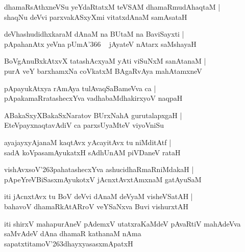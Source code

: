 \documentclass[twoside,12pt,openright]{book}
\def\S{\char'263}
\newcounter{shloka}[chapter]
\begin{document}
\begin{shloka}%
dhamaRsAthxneVSu yeYdaRtatxM teVSAM dhamaRmudAhaqtaM |\\
shaqNu deVvi parxvakASxyXmi vitatxdAnaM samAsataH 
\end{shloka}

\begin{shloka}%
deVhashudidhxkaraM dAnaM na BUtaM na BaviSayxti |\\
pApahanAtx yeVna pUmA\char'366 ~ jAyateV nAtarx saMshayaH
\end{shloka}

\begin{shloka}%
BoVgAnuBxkAtxvX tatashAcxyaM yAti viSuNxM sanAtanaM |\\
purA veY barxhamxNa coVkatxM BAgaRvAya mahAtamxneV 
\end{shloka}

\begin{shloka}%
pApayukAtxya rAmAya tulAvaqSaBameVva ca |\\
pApakamaRratashecxYva vadhabaMdhakirxyoV naqpaH 
\end{shloka}

\begin{shloka}%
ABakaSxyXBakaSxNaratov BUrxNahA gurutalapxgaH |\\
EteVpayxnaqtavAdiV ca parxsUyaMteV viyoVniSu
\end{shloka}

\begin{shloka}%
ayajayxyAjanaM kaqtAvx yAcayitAvx tu niMditAtf |\\
sadA koVpasamAyukatxH sAdhUnAM piVDaneV rataH 
\end{shloka}

\begin{shloka}%
vishAvxsoV\S pahatashecxYva ashucidhaRmaRniMdakaH |\\
pApeYreVBiSasxmAyukotxV jAcnxtAvxtAmxnaM gatAyuSaM
\end{shloka}

\begin{shloka}%
iti jAcnxtAvx tu BoV deVvi dAnaM deVyaM visheVSatAH |\\
bahavoV dhamaRkAtARroV veYSaNxva Buvi vishurxtAH 
\end{shloka}

\begin{center}
iti shirxV mahapurAneV pAdemxV utatxraKaMdeV pAvaRtiV mahAdeVva saMvAdeV dAna dhamaR kathanaM nAma 
sapatxtitamoV\S dhayxyasasxmApatxH 
\end{center}
\end{document}
